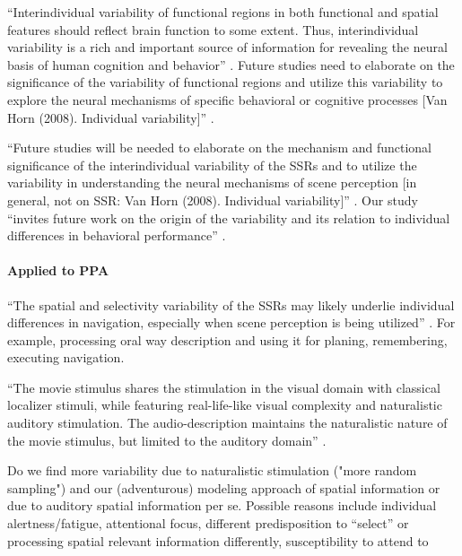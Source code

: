 ``Interindividual variability of functional regions in both functional and
spatial features should reflect brain function to some extent.
%
Thus, interindividual variability is a rich and important source of information
for revealing the neural basis of human cognition and behavior''
\citep{zhen2015quantifying}.
%
Future studies need to elaborate on the significance of the variability of
functional regions and utilize this variability to explore the neural mechanisms
of specific behavioral or cognitive processes [Van Horn (2008). Individual
variability]'' \citep{zhen2015quantifying}.

%
``Future studies will be needed to elaborate on the mechanism and functional
significance of the interindividual variability of the SSRs and to utilize the
variability in understanding the neural mechanisms of scene perception [in
general, not on SSR: Van Horn (2008).  Individual variability]''
\citep{zhen2017quantifying}.
%
Our study ``invites future work on the origin of the variability and its
relation to individual differences in behavioral performance''
\citep{zhen2015quantifying}.



\paragraph{Applied to PPA}


%
``The spatial and selectivity variability of the SSRs may likely underlie
individual differences in navigation, especially when scene perception is being
utilized'' \citep{zhen2017quantifying}.
%
For example, processing oral way description and using it for planing,
remembering, executing navigation.

%
``The movie stimulus shares the stimulation in the visual domain with classical
localizer stimuli, while featuring real-life-like visual complexity and
naturalistic auditory stimulation.
%
The audio-description maintains the naturalistic nature of the movie stimulus,
but limited to the auditory domain'' \citep{haeusler2022processing}.

%
Do we find more variability due to naturalistic stimulation ("more random
sampling") and our (adventurous) modeling approach of spatial information or due
to auditory spatial information per se.
%
Possible reasons include individual alertness/fatigue, attentional focus,
different predisposition to ``select'' or processing spatial relevant
information differently, susceptibility to attend to

